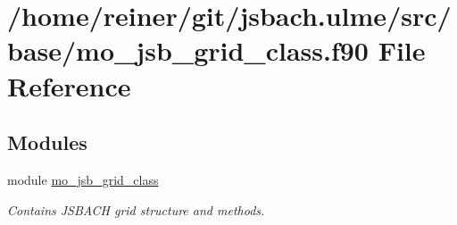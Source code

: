 \hypertarget{mo__jsb__grid__class_8f90}{}\section{/home/reiner/git/jsbach.ulme/src/base/mo\+\_\+jsb\+\_\+grid\+\_\+class.f90 File Reference}
\label{mo__jsb__grid__class_8f90}
\subsection*{Modules}
\begin{DoxyCompactItemize}
\item 
module \hyperlink{namespacemo__jsb__grid__class}{mo\+\_\+jsb\+\_\+grid\+\_\+class}
\begin{DoxyCompactList}\small\item\em Contains J\+S\+B\+A\+C\+H grid structure and methods. \end{DoxyCompactList}\end{DoxyCompactItemize}

